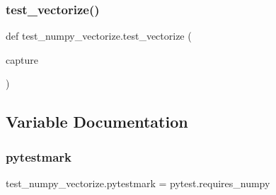 \subsubsection{\texorpdfstring{test\_vectorize()}{test\_vectorize()}}
{\footnotesize\ttfamily def test\+\_\+numpy\+\_\+vectorize.\+test\+\_\+vectorize (\begin{DoxyParamCaption}\item[{}]{capture }\end{DoxyParamCaption})}



\subsection{Variable Documentation}
\mbox{\label{namespacetest__numpy__vectorize_a240730e7d9cb184a6667df5809ee7ee8}} 
\subsubsection{\texorpdfstring{pytestmark}{pytestmark}}
{\footnotesize\ttfamily test\+\_\+numpy\+\_\+vectorize.\+pytestmark = pytest.\+requires\+\_\+numpy}

